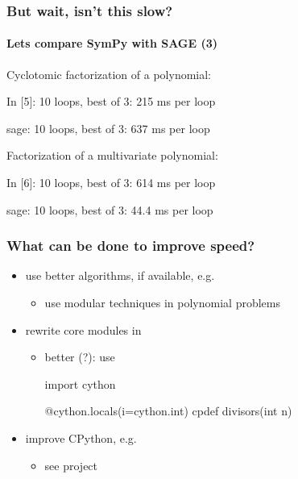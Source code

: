 \documentclass{beamer}
\begin{document}
\begin{frame}[fragile]
    \frametitle{But wait, isn't this slow?}
    \framesubtitle{Lets compare SymPy with SAGE (3)}

    Cyclotomic factorization of a polynomial:
    \begin{python}
In [5]: %
10 loops, best of 3: 215 ms per loop
    \end{python}
    \begin{python}
sage: %
10 loops, best of 3: 637 ms per loop
    \end{python}

    Factorization of a multivariate polynomial:
    \begin{python}
In [6]: %
10 loops, best of 3: 614 ms per loop
    \end{python}
    \begin{python}
sage: %
10 loops, best of 3: 44.4 ms per loop
    \end{python}
\end{frame}

\begin{frame}[fragile]
    \frametitle{What can be done to improve speed?}

    \begin{itemize}
        \item use better algorithms, if available, e.g.
        \begin{itemize}
            \item use modular techniques in polynomial problems
        \end{itemize}
        \item rewrite core modules in 
        \begin{itemize}
            \item better (?): use 
\begin{python}
import cython

@cython.locals(i=cython.int)
cpdef divisors(int n)
\end{python}
        \end{itemize}
        \item improve CPython, e.g.
        \begin{itemize}
            \item see  project
        \end{itemize}
    \end{itemize}
\end{frame}
\end{document}
